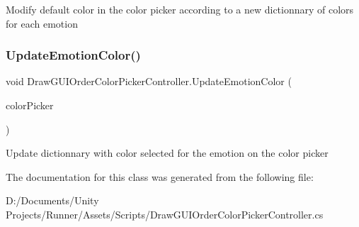 Modify default color in the color picker according to a new dictionnary of colors for each emotion \mbox{\label{class_draw_g_u_i_order_color_picker_controller_a80f6160ddce320ca94c0dd24b5662c7e}} 
\subsubsection{\texorpdfstring{Update\+Emotion\+Color()}{UpdateEmotionColor()}}
{\footnotesize\ttfamily void Draw\+G\+U\+I\+Order\+Color\+Picker\+Controller.\+Update\+Emotion\+Color (\begin{DoxyParamCaption}\item[{\mbox{\hyperlink{class_color_picker_controller}{Color\+Picker\+Controller}}}]{color\+Picker }\end{DoxyParamCaption})\hspace{0.3cm}{\ttfamily [private]}}

Update dictionnary with color selected for the emotion on the color picker 

The documentation for this class was generated from the following file\+:\begin{DoxyCompactItemize}
\item 
D\+:/\+Documents/\+Unity Projects/\+Runner/\+Assets/\+Scripts/Draw\+G\+U\+I\+Order\+Color\+Picker\+Controller.\+cs\end{DoxyCompactItemize}
